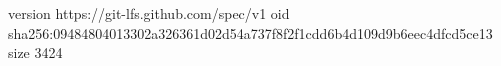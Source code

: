 version https://git-lfs.github.com/spec/v1
oid sha256:09484804013302a326361d02d54a737f8f2f1cdd6b4d109d9b6eec4dfcd5ce13
size 3424
